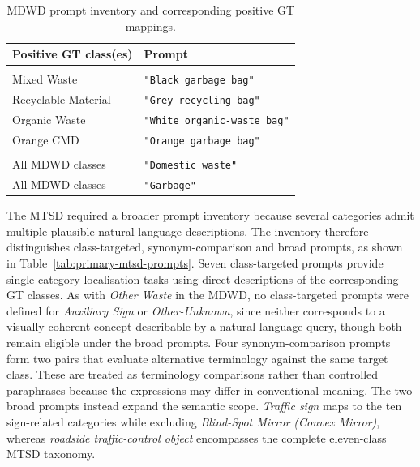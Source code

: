 \begin{table}[H]
\centering
\small
\caption{\gls{MDWD} prompt inventory and corresponding positive \gls{GT} mappings.}
\label{tab:primary-mdwd-prompts}
\renewcommand{\arraystretch}{1.35}
\begin{tabularx}{\textwidth}{
    @{}
    >{\raggedright\arraybackslash}p{4.2cm}
    >{\raggedleft\arraybackslash}X
    @{}
}
\toprule
\textbf{Positive \gls{GT} class(es)} & \textbf{Prompt} \\
\midrule
\multicolumn{2}{@{}l}{\textbf{\textsc{Class-targeted prompts}}} \\
\cmidrule(lr){1-2}
Mixed Waste & \texttt{"Black garbage bag"} \\
Recyclable Material & \texttt{"Grey recycling bag"} \\
Organic Waste & \texttt{"White organic-waste bag"} \\
Orange \gls{CMD} & \texttt{"Orange garbage bag"} \\
\addlinespace[0.7em]
\multicolumn{2}{@{}l}{\textbf{\textsc{Broad prompts}}} \\
\cmidrule(lr){1-2}
All \gls{MDWD} classes & \texttt{"Domestic waste"} \\
All \gls{MDWD} classes & \texttt{"Garbage"} \\
\bottomrule
\end{tabularx}
\end{table}

\noindent The \gls{MTSD} required a broader prompt inventory because several categories admit multiple plausible natural-language descriptions. The inventory therefore distinguishes class-targeted, synonym-comparison and broad prompts, as shown in Table~\ref{tab:primary-mtsd-prompts}. Seven class-targeted prompts provide single-category localisation tasks using direct descriptions of the corresponding \gls{GT} classes. As with \emph{Other Waste} in the \gls{MDWD}, no class-targeted prompts were defined for \emph{Auxiliary Sign} or \emph{Other-Unknown}, since neither corresponds to a visually coherent concept describable by a natural-language query, though both remain eligible under the broad prompts. Four synonym-comparison prompts form two pairs that evaluate alternative terminology against the same target class. These are treated as terminology comparisons rather than controlled paraphrases because the expressions may differ in conventional meaning. The two broad prompts instead expand the semantic scope. \emph{Traffic sign} maps to the ten sign-related categories while excluding \textit{Blind-Spot Mirror (Convex Mirror)}, whereas \emph{roadside traffic-control object} encompasses the complete eleven-class \gls{MTSD} taxonomy.

